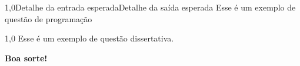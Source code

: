 \documentclass[
    12pt,     
    openright,
    twoside,  
    a4paper,  
    english,  
    brazil,   
]{memoir}
\begin{document}
\mainmatter



\begin{questaoProgramacao}{1,0}{Detalhe da entrada esperada}{Detalhe da saída esperada}
    Esse é um exemplo de questão de programação
\end{questaoProgramacao}



\begin{questaoDissertativa}{1,0}
    Esse é um exemplo de questão dissertativa.
    
\end{questaoDissertativa}



{\raggedleft \textbf{Boa sorte!}\par}
\end{document}
